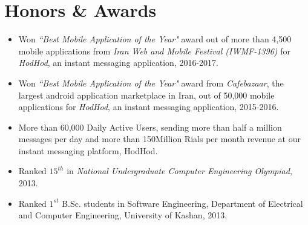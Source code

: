 \documentclass[10pt,a4paper,roman]{moderncv}        %
\begin{document}
\section{Honors \& Awards}
\begin{itemize} \itemsep \shortSpace
\item Won \textit{``Best Mobile Application of the Year"} award out of more than 4,500 mobile applications from \textit{Iran Web and Mobile Festival (IWMF-1396)} for \textit{HodHod}, an instant messaging application, 2016-2017.

\item Won \textit{``Best Mobile Application of the Year"} award from \textit{Cafebazaar}, the largest android application marketplace in Iran, out of 50,000 mobile applications for \textit{HodHod}, an instant messaging application, 2015-2016.

\item More than 60,000 Daily Active Users, sending more than half a million messages per day and more than 150Million Rials per month revenue at our instant messaging platform, HodHod.

\item Ranked $15^{th}$ in \textit{National Undergraduate Computer Engineering Olympiad}, 2013.

\item Ranked $1^{st}$ B.Sc. students in Software Engineering, Department of Electrical and Computer Engineering, University of Kashan, 2013.

\end{itemize}






\end{document}
